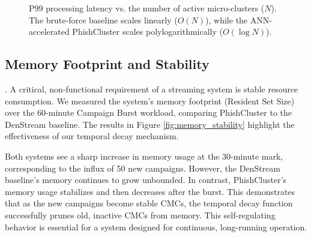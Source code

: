 \documentclass[journal,article,submit,pdftex,moreauthors]{Definitions/mdpi}
\begin{document}
\begin{figure}[h!]
\centering
{}
\caption{P99 processing latency vs. the number of active micro-clusters ($N$). The brute-force baseline scales linearly ($O(N)$), while the ANN-accelerated PhishCluster scales polylogarithmically ($O(\log N)$).}
\label{fig:latency_scaling}
\end{figure}

\subsection{Memory Footprint and Stability}.
A critical, non-functional requirement of a streaming system is stable resource consumption. We measured the system's memory footprint (Resident Set Size) over the 60-minute Campaign Burst workload, comparing PhishCluster to the DenStream baseline. The results in Figure \ref{fig:memory_stability} highlight the effectiveness of our temporal decay mechanism.

Both systems see a sharp increase in memory usage at the 30-minute mark, corresponding to the influx of 50 new campaigns. However, the DenStream baseline's memory continues to grow unbounded. In contrast, PhishCluster's memory usage stabilizes and then decreases after the burst. This demonstrates that as the new campaigns become stable CMCs, the temporal decay function successfully prunes old, inactive CMCs from memory. This self-regulating behavior is essential for a system designed for continuous, long-running operation.
\end{document}
